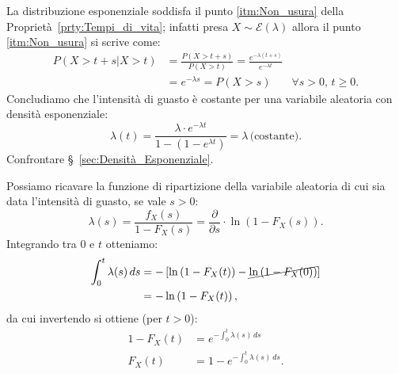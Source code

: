         \begin{prty}
            La distribuzione esponenziale soddisfa il punto \eqref{itm:Non_usura} della Proprietà~\ref{prty:Tempi_di_vita}; infatti presa $X \sim \mathcal{E}(\lambda)$ allora il punto \eqref{itm:Non_usura} si scrive come:
            \begin{align*}
                P(X > t + s | X > t) 
                &= \frac{P(X > t + s)}{P(X > t)}
                = \frac{e^{-\lambda(t+s)}}{e^{-\lambda t}} \\
                &= e^{-\lambda s} = P(X > s) & \forall s > 0,\, t \geq 0
            .\end{align*}
            Concludiamo che l'intensità di guasto è costante per una variabile aleatoria con densità esponenziale: \[
                \lambda(t) = \frac{\lambda \cdot e^{-\lambda t}}{1 - (1 - e^{\lambda t})} = \lambda\,\text{(costante)}
            .\] Confrontare §~\ref{sec:Densità_Esponenziale}.
        \end{prty}
        \begin{obsv}
            Possiamo ricavare la funzione di ripartizione della variabile aleatoria di cui sia data l'intensità di guasto, se vale $s > 0$: \[
                \lambda(s) = \frac{f_X(s)}{1 - F_X(s)} = \frac{\partial}{\partial s}\cdot \ln \left(1 - F_X(s)\right)
            .\] Integrando tra 0 e $t$ otteniamo:
            \begin{align*}
                \int_{0}^{t} \lambda(s)\, ds
                &= -\left[\ln \left(1 - F_X(t)\right) - \cancel{\ln \left(1 - F_X(0)\right)}\right] \\
                &= - \ln \left(1 - F_X(t)\right)
            ,\end{align*}
            da cui invertendo si ottiene (per $t > 0$):
            \begin{align*}
                1 - F_X(t) &= e^{- \int_{0}^{t} \lambda(s)\, ds} \\
                F_X(t) &= 1 - e^{- \int_{0}^{t} \lambda(s)\, ds}
            .\end{align*}
        \end{obsv}
